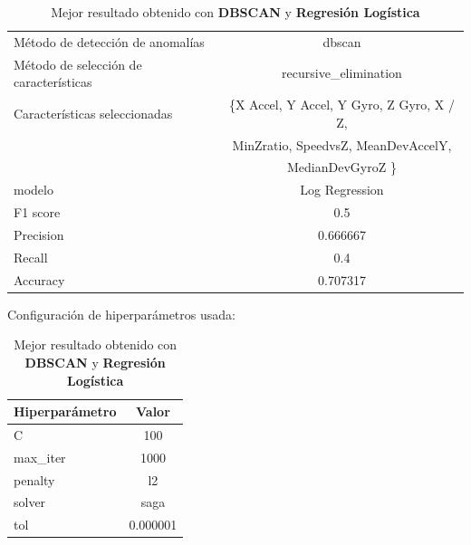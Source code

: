 \begin{appendices}
		\begin{table}[htb]
			\centering
			\caption{Mejor resultado obtenido con \textbf{DBSCAN} y \textbf{Regresión Logística}}
			\label{table:31}
			\begin{tabular}{lc}
				\toprule
				\midrule
					  Método de detección de anomalías &                                             dbscan \\
				Método de selección de características &                              recursive\_elimination \\
						 Características seleccionadas & \{X Accel, Y Accel, Y Gyro, Z Gyro, X / Z, \\ 
						 							   &    MinZratio, SpeedvsZ, MeanDevAccelY,\\
													   &  MedianDevGyroZ \} \\
												modelo &                                     Log Regression \\
											  F1 score &                                                0.5 \\
											 Precision &                                           0.666667 \\
												Recall &                                                0.4 \\
											  Accuracy &                                           0.707317 \\
				\bottomrule
				\end{tabular}
			\newline
			\newline
			Configuración de hiperparámetros usada:
			\begin{tabular}{lc}
				\toprule
				Hiperparámetro &     Valor \\
				\midrule
							 C &       100 \\
					  max\_iter &      1000 \\
					   penalty &        l2 \\
						solver &      saga \\
						   tol &  0.000001 \\
				\bottomrule
			\end{tabular}
			
		\end{table}


\end{appendices}
